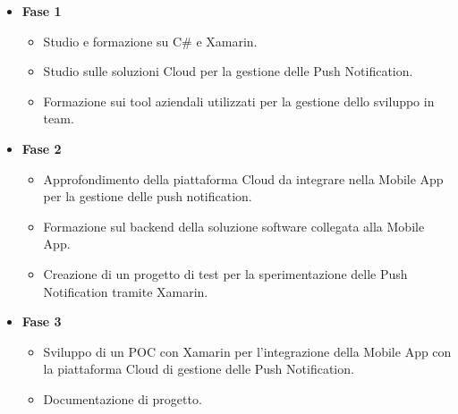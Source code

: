 {\begin{itemize}
        \item \textbf{Fase 1}
        \begin{itemize}
            \item Studio e formazione su C\# e Xamarin.
            \item Studio sulle soluzioni Cloud per la gestione delle Push Notification.
            \item Formazione sui tool aziendali utilizzati per la gestione dello sviluppo in team.
        \end{itemize}
        \item \textbf{Fase 2}
        \begin{itemize}
            \item Approfondimento della piattaforma Cloud da integrare nella Mobile App per la gestione delle push notification.
            \item Formazione sul backend della soluzione software collegata alla Mobile App.
            \item Creazione di un progetto di test per la sperimentazione delle Push Notification tramite Xamarin.
        \end{itemize}
        \item \textbf{Fase 3}
        \begin{itemize}
            \item Sviluppo di un POC con Xamarin per l’integrazione della Mobile App con la piattaforma Cloud di gestione delle Push Notification.
            \item Documentazione di progetto.
        \end{itemize}
    \end{itemize}
}

\newcommand{\totaleOre}{320}

\newcommand{\obiettiviObbligatori}{
     \item \underline{\textit{O01}}: Studio delle possibili piattaforme Cloud per la gestione delle Push Notification.  
	 \item \underline{\textit{O02}}: Selezione della piattaforma Cloud che ai requisiti della Mobile App e dal dominio applicativo specifico.
	 \item \underline{\textit{O03}}: Sperimentazione dell'integrazione della piattaforma Cloud con la Mobile App in Xamarin.
}

